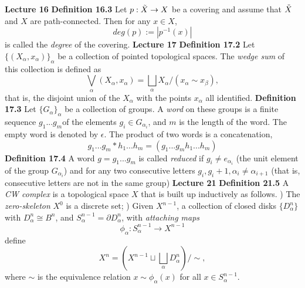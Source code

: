 \newline \newline \textbf{Lecture 16}
\newline \newline \textbf{Definition 16.3} Let $p:\Tilde{X} \rightarrow X$ be a covering and assume that $\Tilde{X}$ and $X$ are path-connected. Then for any $x \in X$, $$deg(p) := |p^{-1}(x)|$$ is called the \textit{degree} of the covering.
\newline \newline \textbf{Lecture 17}
\newline \newline \textbf{Definition 17.2} Let $\{(X_\alpha,x_\alpha)\}_\alpha$ be a collection of pointed topological spaces. The \textit{wedge sum} of this collection is defined as $$\bigvee_{\alpha}(X_\alpha,x_\alpha) = \bigsqcup_\alpha X_{\alpha}/(x_\alpha \sim x_\beta),$$ that is, the disjoint union of the $X_\alpha$ with the points $x_\alpha$ all identified.
\newline \newline \textbf{Definition 17.3} Let $\{G_\alpha\}_\alpha$ be a collection of groups. A \textit{word} on these groups is a finite sequence $g_1...g_m$of the elements $g_i \in G_{\alpha_i}$, and $m$ is the length of the word. The empty word is denoted by $\epsilon$. The product of two words is a concatenation, $$g_1...g_m \ast h_1...h_m = (g_1...g_mh_1...h_m)$$ 
\newline \newline \textbf{Definition 17.4} A word $g = g_1...g_m$ is called \textit{reduced} if $g_i \not= e_{\alpha_{i}}$ (the unit element of the group $G_{\alpha_i}$) and for any two consecutive letters $g_i, g_i+1, \alpha_i \not= \alpha_{i+1}$ (that is, consecutive letters are not in the same group)
\newline \newline \textbf{Lecture 21}
\newline \newline \textbf{Definition 21.5} A \textit{CW complex} is a topological space $X$ that is built up inductively as follows.
\newline {}) The \textit{zero-skeleton} $X^0$ is a discrete set;
\newline {}) Given $X^{n-1}$, a collection of closed disks $\{ D_\alpha^n \}$ with $D_\alpha^n \cong B^n$, and $S_\alpha^{n-1} = \partial D_\alpha^n$, with \textit{attaching maps} $$\phi_\alpha:S_\alpha^{n-1} \rightarrow X^{n-1}$$ define $$X^n = (X^{n-1} \sqcup \bigsqcup_\alpha D_\alpha^n)/\sim,$$ where $\sim$ is the equivalence relation $x \sim \phi_\alpha(x)$ for all $x \in S^{n-1}_\alpha$. 
